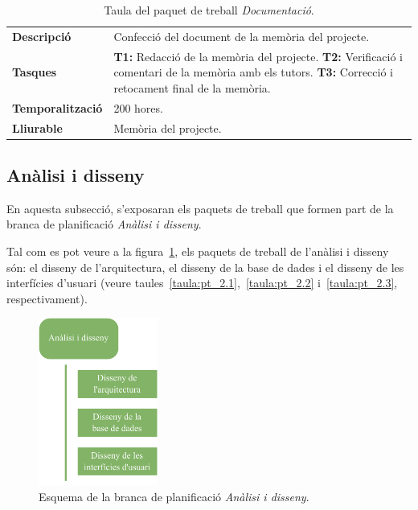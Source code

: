 \documentclass[a4paper,12pt]{ThesisStyle}
\begin{document}
\begin{table}[H]
  \begin{tabularx}{\textwidth}{l | X}
    \toprule
    \rowcolor{Gray}
    \multicolumn{2}{c}{\texttt{\textbf{PT\_1.3:}} Documentació}\\
    \midrule[0.9pt]
    \textbf{Descripció}       & Confecció del document de la memòria del projecte.\\
    \midrule
    \textbf{Tasques}          & \textbf{T1:} Redacció de la memòria del projecte.
    \newline \textbf{T2:} Verificació i comentari de la memòria amb els tutors.
    \newline \textbf{T3:} Correcció i retocament final de la memòria.\\
    \midrule
    \textbf{Temporalització}  & 200 hores.\\
    \midrule
    \textbf{Lliurable}        & Memòria del projecte.\\
    \bottomrule
  \end{tabularx}
  \caption{\label{taula:pt_1.3} Taula del paquet de treball \emph{Documentació}.}
\end{table}

\newpage

\subsection{Anàlisi i disseny}
\label{subsec:analisi_disseny}

En aquesta subsecció, s'exposaran els paquets de treball que formen part de la branca de planificació \emph{Anàlisi i disseny}.

Tal com es pot veure a la figura~\ref{img:pt_analisi_disseny}, els paquets de treball de l'anàlisi i disseny són: el disseny de l'arquitectura, el disseny de la base de dades i el disseny de les interfícies d'usuari (veure taules~\ref{taula:pt_2.1},~\ref{taula:pt_2.2} i~\ref{taula:pt_2.3}, respectivament).

\begin{figure}[htpb]
	\centering
	\includegraphics[width=0.35\textwidth]{assets/working_packages/analisiDisseny.pdf}
	\caption{\label{img:pt_analisi_disseny}Esquema de la branca de planificació \emph{Anàlisi i disseny}.}
\end{figure}
\end{document}
